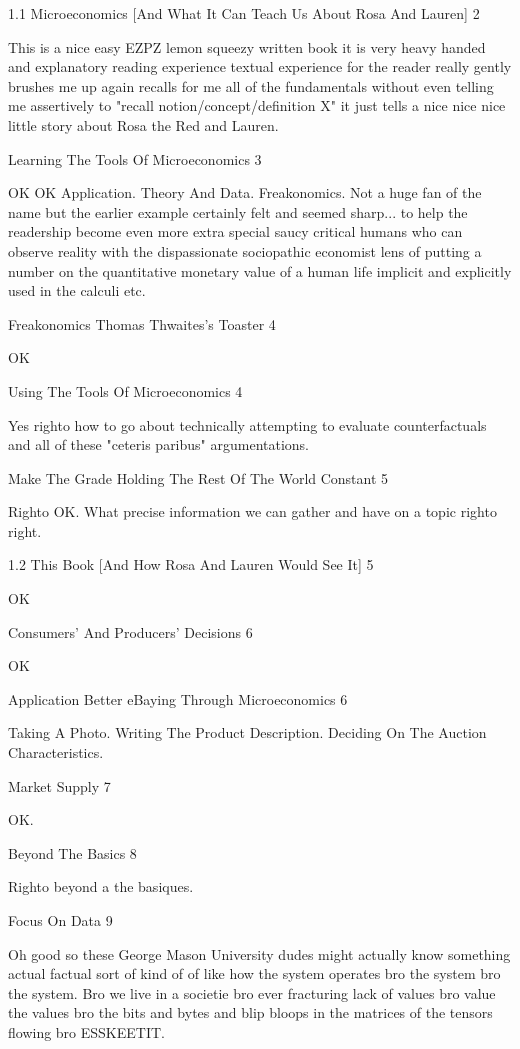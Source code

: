 1.1 Microeconomics [And What It Can Teach Us About Rosa And Lauren] 2

This is a nice easy EZPZ lemon squeezy written book it is very heavy handed and explanatory reading experience textual experience for the reader really gently brushes me up again recalls for me all of the fundamentals without even telling me assertively to "recall notion/concept/definition X" it just tells a nice nice nice little story about Rosa the Red and Lauren.

Learning The Tools Of Microeconomics 3

OK OK Application. Theory And Data. Freakonomics. Not a huge fan of the name but the earlier example certainly felt and seemed sharp... to help the readership become even more extra special saucy critical humans who can observe reality with the dispassionate sociopathic economist lens of putting a number on the quantitative monetary value of a human life implicit and explicitly used in the calculi etc.

Freakonomics Thomas Thwaites's Toaster 4

OK

Using The Tools Of Microeconomics 4

Yes righto how to go about technically attempting to evaluate counterfactuals and all of these "ceteris paribus" argumentations.

Make The Grade Holding The Rest Of The World Constant 5

Righto OK. What precise information we can gather and have on a topic righto right.

1.2 This Book [And How Rosa And Lauren Would See It] 5

OK

Consumers' And Producers' Decisions 6

OK

Application Better eBaying Through Microeconomics 6

Taking A Photo. Writing The Product Description. Deciding On The Auction Characteristics.

Market Supply 7

OK.

Beyond The Basics 8

Righto beyond a the basiques.

Focus On Data 9

Oh good so these George Mason University dudes might actually know something actual factual sort of kind of of like how the system operates bro the system bro the system. Bro we live in a societie bro ever fracturing lack of values bro value the values bro the bits and bytes and blip bloops in the matrices of the tensors flowing bro ESSKEETIT.

